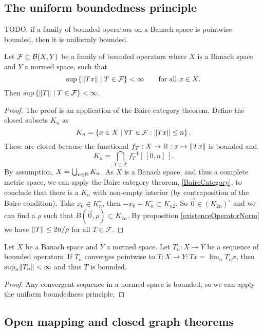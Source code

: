 \subsection{The uniform boundedness principle}
TODO: if a family of bounded operators on a Banach space is pointwise bounded, then it is uniformly bounded.
\begin{theorem} \label{uniformBoundednessPrinciple}
Let $\mathcal{F}\subset \operatorname{\mathcal{B}}(X,Y)$ be a family of bounded operators where $X$ is a Banach space and $Y$ a normed space, such that
\[ \sup\left\{ \lVert Tx\rVert \;\middle|\; T\in\mathcal{F} \right\} < \infty \qquad \text{for all $x\in X$}. \]
Then $\sup\left\{ \lVert T\rVert \;\middle|\; T\in\mathcal{F} \right\} < \infty$.
\end{theorem}
\begin{proof}
The proof is an application of the Baire category theorem. Define the closed subsets $K_n$ as
\[ K_n = \left\{ x\in X \;\middle|\; \forall T\in\mathcal{F}: \lVert Tx\rVert\leq n \right\}. \]
These are closed because the functional $f_T: X\to \mathbb{R}: x\mapsto \lVert Tx\rVert$ is bounded and
\[ K_n = \bigcap_{T\in\mathcal{F}}f_T^{-1}[\,[0,n]\,]. \]
By assumption, $X=\bigcup_{n\in\mathbb{N}} K_n$. As $X$ is a Banach space, and thus a complete metric space, we can apply the Baire category theorem, \ref{BaireCategory}, to conclude that there is a $K_n$ with non-empty interior (by contraposition of the Baire condition). Take $x_0\in K_n^\circ$, then $-x_0+K_n^\circ \subset K_{n2}$. So $\vec{0}\in (K_{2n})^\circ$ and we can find a $\rho$ such that $B(\vec{0},\rho)\subset K_{2n}$. By proposition \ref{existenceOperatorNorm} we have $\lVert T\rVert\leq 2n/\rho$ for all $T\in\mathcal{F}$.
\end{proof}
\begin{corollary} \label{BanachSteinhaus}
Let $X$ be a Banach space and $Y$ a normed space. Let $T_n: X\to Y$ be a sequence of bounded operators. If $T_n$ converges pointwise to $T:X\to Y: Tx = \lim_n T_n x$, then $\sup_n\lVert T_n\rVert <\infty$ and thus $T$ is bounded.
\end{corollary}
\begin{proof}
Any convergent sequence in a normed space is bounded, so we can apply the uniform boundedness principle.
\end{proof}

\subsection{Open mapping and closed graph theorems}

